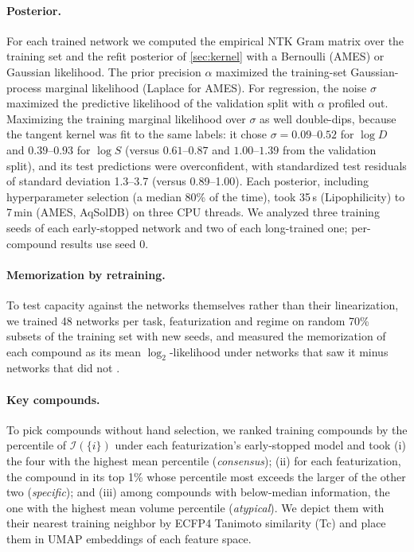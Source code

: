 \documentclass[10pt,twocolumn,letterpaper]{article}
\theoremstyle{definition}
\newcommand{\Inf}{\mathcal{I}}
\begin{document}
\paragraph{Posterior.} For each trained network we computed the empirical NTK Gram matrix over the training set and the refit posterior of \cref{sec:kernel} with a Bernoulli (AMES) or Gaussian likelihood. The prior precision $\alpha$ maximized the training-set Gaussian-process marginal likelihood (Laplace for AMES). For regression, the noise $\sigma$ maximized the predictive likelihood of the validation split with $\alpha$ profiled out. Maximizing the training marginal likelihood over $\sigma$ as well double-dips, because the tangent kernel was fit to the same labels: it chose $\sigma=0.09$--$0.52$ for $\log D$ and $0.39$--$0.93$ for $\log S$ (versus $0.61$--$0.87$ and $1.00$--$1.39$ from the validation split), and its test predictions were overconfident, with standardized test residuals of standard deviation 1.3--3.7 (versus 0.89--1.00). Each posterior, including hyperparameter selection (a median 80\% of the time), took 35\,s (Lipophilicity) to 7\,min (AMES, AqSolDB) on three CPU threads. We analyzed three training seeds of each early-stopped network and two of each long-trained one; per-compound results use seed 0.

\paragraph{Memorization by retraining.} To test capacity against the networks themselves rather than their linearization, we trained 48 networks per task, featurization and regime on random 70\% subsets of the training set with new seeds, and measured the memorization of each compound as its mean $\log_2$-likelihood under networks that saw it minus networks that did not \citep{feldman2020neural}.

\paragraph{Key compounds.} To pick compounds without hand selection, we ranked training compounds by the percentile of $\Inf(\{i\})$ under each featurization's early-stopped model and took (i) the four with the highest mean percentile (\emph{consensus}); (ii) for each featurization, the compound in its top 1\% whose percentile most exceeds the larger of the other two (\emph{specific}); and (iii) among compounds with below-median information, the one with the highest mean volume percentile (\emph{atypical}). We depict them with their nearest training neighbor by ECFP4 Tanimoto similarity (Tc) and place them in UMAP embeddings \citep{mcinnes2018} of each feature space.
\end{document}
